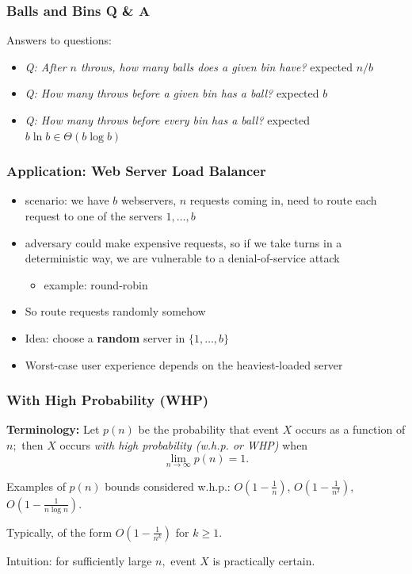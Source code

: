 \documentclass[10pt,aspectratio=169]{beamer}
\begin{document}
\begin{frame} \frametitle{Balls and Bins Q \& A}
Answers to questions:
\begin{itemize}
  \item \emph{Q: After $n$ throws, how many balls does a given bin have?} expected $n/b$
  \item \emph{Q: How many throws before a given bin has a ball?} expected $b$
  \item \emph{Q: How many throws before every bin has a ball?} expected $b \ln b \in \Theta(b \log b)$
\end{itemize}
\end{frame}

\begin{frame} \frametitle{Application: Web Server Load Balancer}
  \begin{itemize}
    \item scenario: we have $b$ webservers, $n$ requests coming in, need to route
      each request to one of the servers $1, \ldots, b$
    \item adversary could make expensive requests, so if we take turns in a deterministic
      way, we are vulnerable to a denial-of-service attack
      \begin{itemize}
        \item example: round-robin
      \end{itemize}
    \item So route requests randomly somehow
    \item Idea: choose a \textbf{random} server in $\{1, \ldots, b\}$
    \item Worst-case user experience depends on the heaviest-loaded server
  \end{itemize}
\end{frame}

\begin{frame} \frametitle{With High Probability (WHP)}

\textbf{Terminology:} Let $p(n)$ be the probability that event $X$ occurs as a function of $n;$
then $X$ occurs \emph{with high probability (w.h.p. or WHP)} when
\[ \lim_{n \rightarrow \infty} p(n) = 1. \]

Examples of $p(n)$ bounds considered w.h.p.: $O(1-\frac{1}{n})$, $O(1-\frac{1}{n^2})$, $O(1-\frac{1}{n \log n}).$
\vspace{12pt}

Typically, of the form $O(1-\frac{1}{n^k})$ for $k \geq 1.$
\vspace{12pt}

Intuition: for sufficiently large $n,$ event $X$ is practically certain.
\end{frame}
\end{document}
